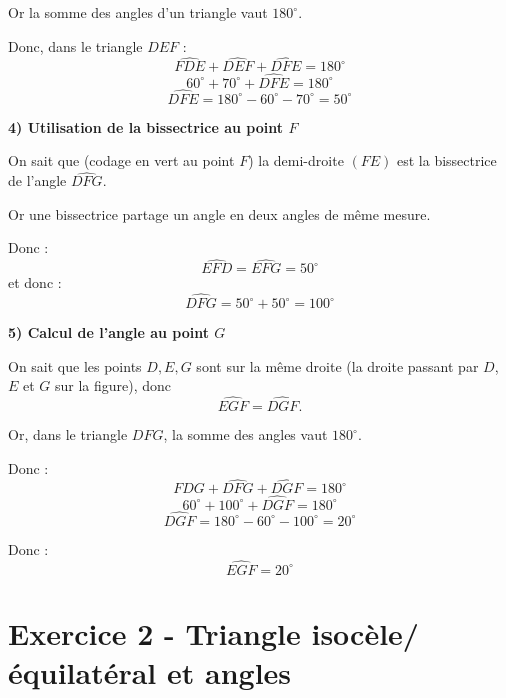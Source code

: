 \documentclass[answers]{exam}
\begin{document}
\begin{solution}
Or la somme des angles d'un triangle vaut $180^\circ$.

Donc, dans le triangle $DEF$ :
\[
\widehat{FDE} + \widehat{DEF} + \widehat{DFE} = 180^\circ
\]
\[
60^\circ + 70^\circ + \widehat{DFE} = 180^\circ
\]
\[
\widehat{DFE} = 180^\circ - 60^\circ - 70^\circ = 50^\circ
\]

\medskip

\textbf{4) Utilisation de la bissectrice au point $F$}

On sait que (codage en vert au point $F$) la demi-droite $(FE)$ est la bissectrice de l'angle $\widehat{DFG}$.

Or une bissectrice partage un angle en deux angles de même mesure.

Donc :
\[
\widehat{EFD} = \widehat{EFG} = 50^\circ
\]
et donc :
\[
\widehat{DFG} = 50^\circ + 50^\circ = 100^\circ
\]

\medskip

\textbf{5) Calcul de l'angle au point $G$}

On sait que les points $D,E,G$ sont sur la même droite (la droite passant par $D$, $E$ et $G$ sur la figure), donc
\[
\widehat{EGF} = \widehat{DGF}.
\]

Or, dans le triangle $DFG$, la somme des angles vaut $180^\circ$.

Donc :
\[
\widehat{FDG} + \widehat{DFG} + \widehat{DGF} = 180^\circ
\]
\[
60^\circ + 100^\circ + \widehat{DGF} = 180^\circ
\]
\[
\widehat{DGF} = 180^\circ - 60^\circ - 100^\circ = 20^\circ
\]

Donc :
\[
\boxed{\widehat{EGF} = 20^\circ}
\]

\end{solution}

\section*{Exercice 2 - Triangle isocèle/équilatéral et angles}

\end{document}
